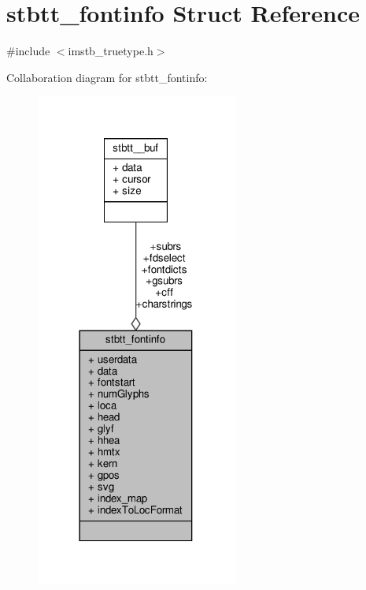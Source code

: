 \hypertarget{structstbtt__fontinfo}{}\section{stbtt\+\_\+fontinfo Struct Reference}
\label{structstbtt__fontinfo}


{\ttfamily \#include $<$imstb\+\_\+truetype.\+h$>$}



Collaboration diagram for stbtt\+\_\+fontinfo\+:
\nopagebreak
\begin{figure}[H]
\begin{center}
\leavevmode
\includegraphics[width=189pt]{structstbtt__fontinfo__coll__graph}
\end{center}
\end{figure}
